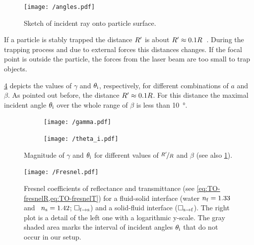 \begin{figure}[thp]
  \centering
  \texttt{[image: /angles.pdf]}
  \caption{Sketch of incident ray onto particle surface.}
  \label{fig:TO-angles}
\end{figure}

If a particle is stably trapped the distance $R^{\prime}$ is about $R^{\prime} 
\approx 0.1R$~\cite{Lamprecht2017}. During the trapping process and due to 
external forces this distances changes. If the focal point is outside the 
particle, the forces from the laser beam are too small to trap objects.

\cref{fig:TO-gamma_theta} depicts the values of $\gamma$ and $\theta_{\mathrm{i}}$, 
respectively, for different combinations of $a$ and $\beta$. As pointed out 
before, the distance $R^{\prime} \approx 0.1R$. For this distance the maximal 
incident angle $\theta_{\mathrm{i}}$ over the whole range of $\beta$ is less than 
\SI{10}{\degree}.

\begin{figure}
  \centering
  \begin{subfigure}[b]{0.45\textwidth}
    \centering
    \texttt{[image: /gamma.pdf]}
    \caption{}
    \label{fig:TO-gamma}
  \end{subfigure}
  \hfill
  \begin{subfigure}[b]{0.45\textwidth}
    \centering
    \texttt{[image: /theta\_i.pdf]}
    \caption{}
    \label{fig:TO-theta_i}
  \end{subfigure}
    \caption{Magnitude of $\gamma$ and $\theta_{\mathrm{i}}$ for different values of 
    $\nicefrac{R^{\prime}}{R}$ and $\beta$ (see also \cref{fig:TO-angles}).}
  \label{fig:TO-gamma_theta}
\end{figure}

\begin{figure}[tbp]
  \centering
  \texttt{[image: /Fresnel.pdf]}
  \caption{Fresnel coefficients of reflectance and transmittance (see 
    \cref{eq:TO-fresnelR,eq:TO-fresnelT}) for a fluid-solid interface (water 
    $n_{\mathrm{f}}=1.33$ and \SiO~$n_{\mathrm{s}}=1.42$; $\Box_{\mathrm{f}\rightarrow\mathrm{s}}$) and a 
    solid-fluid interface ($\Box_{\mathrm{s}\rightarrow\mathrm{f}}$). The right plot is 
    a detail of the left one with a logarithmic y-scale.  The gray shaded area 
  marks the interval of incident angles $\theta_{\mathrm{i}}$ that do not occur in our 
setup.}
  \label{fig:TO-fresnel}
\end{figure}

